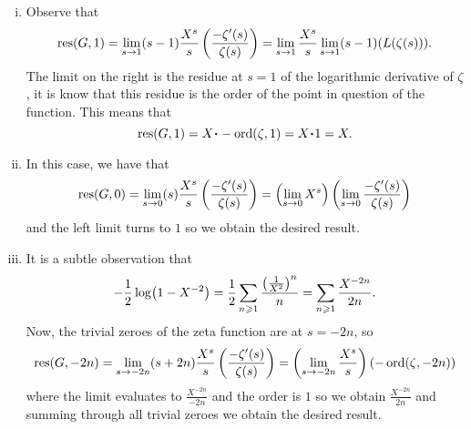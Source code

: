 \documentclass[12pt]{memoir}
\begin{document}
\begin{ptcbr}
    \begin{enumerate}[i)]
        \item Observe that 
        $$\operatorname*{res}(G,1)=\lim_{s\to 1}(s-1)\frac{X^s}{s}\left(\frac{-\zeta'(s)}{\zeta(s)}\right)=\lim_{s\to 1}\frac{X^s}{s}\lim_{s\to 1}(s-1)(L(\zeta(s))).$$
        The limit on the right is the residue at $s=1$ of the logarithmic derivative of $\zeta$, it is know that this residue is the order of the point in question of the function. This means that 
        $$\res(G,1)=X\.-\ord(\zeta,1)=X\.1=X.$$
        \item In this case, we have that 
        $$\operatorname*{res}(G,0)=\lim_{s\to 0}(s)\frac{X^s}{s}\left(\frac{-\zeta'(s)}{\zeta(s)}\right)=\left(\lim_{s\to 0}X^s\right)\left(\lim_{s\to 0}\frac{-\zeta'(s)}{\zeta(s)}\right)$$
        and the left limit turns to $1$ so we obtain the desired result.
        \item It is a subtle observation that 
        $$-\half\log(1-X^{-2})=\half\sum_{n\geq 1}\frac{\left(\frac
        {1}{X^2}\right)^n}{n}=\sum_{n\geq 1}\frac{X^{-2n}}{2n}.$$
        Now, the trivial zeroes of the zeta function are at $s=-2n$, so 
        $$\operatorname*{res}(G,-2n)=\lim_{s\to-2n}(s+2n)\frac{X^s}{s}\left(\frac{-\zeta'(s)}{\zeta(s)}\right)=\left(\lim_{s\to-2n}\frac{X^s}{s}\right)(-\operatorname{ord}(\zeta,-2n))$$
        where the limit evaluates to $\frac{X^{-2n}}{-2n}$ and the order is $1$ so we obtain $\frac{X^{-2n}}{2n}$ and summing through all trivial zeroes we obtain the desired result.
    \end{enumerate}
\end{ptcbr}
\end{document}
